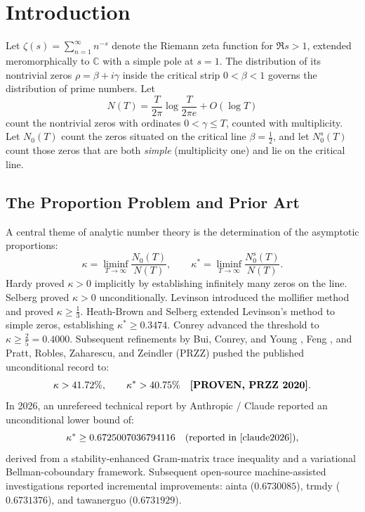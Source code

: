 \documentclass[11pt,a4paper]{article}
\theoremstyle{remark}
\newcommand{\Nc}{N_0^s}
\begin{document}
\tableofcontents

\section{Introduction}

Let $\zeta(s) = \sum_{n=1}^\infty n^{-s}$ denote the Riemann zeta function for $\Re s > 1$, extended meromorphically to $\mathbb{C}$ with a simple pole at $s=1$. The distribution of its nontrivial zeros $\rho = \beta + i\gamma$ inside the critical strip $0 < \beta < 1$ governs the distribution of prime numbers. Let
\[
 N(T) = \frac{T}{2\pi}\log\frac{T}{2\pi e} + O(\log T)
\]
count the nontrivial zeros with ordinates $0 < \gamma \le T$, counted with multiplicity. Let $N_0(T)$ count the zeros situated on the critical line $\beta = \frac{1}{2}$, and let $\Nc(T)$ count those zeros that are both \emph{simple} (multiplicity one) and lie on the critical line.

\subsection{The Proportion Problem and Prior Art}
A central theme of analytic number theory is the determination of the asymptotic proportions:
\[
 \kappa = \liminf_{T\to\infty} \frac{N_0(T)}{N(T)}, \qquad \kappa^* = \liminf_{T\to\infty} \frac{\Nc(T)}{N(T)}.
\]
Hardy \cite{hardy1914} proved $\kappa > 0$ implicitly by establishing infinitely many zeros on the line. Selberg \cite{selberg1942} proved $\kappa > 0$ unconditionally. Levinson \cite{levinson1974} introduced the mollifier method and proved $\kappa \ge \frac{1}{3}$. Heath-Brown and Selberg \cite{PLACEHOLDER_heathbrown1979} extended Levinson's method to simple zeros, establishing $\kappa^* \ge 0.3474$. Conrey \cite{conrey1989} advanced the threshold to $\kappa \ge \frac{2}{5} = 0.4000$. Subsequent refinements by Bui, Conrey, and Young \cite{bui2011}, Feng \cite{PLACEHOLDER_feng2012}, and Pratt, Robles, Zaharescu, and Zeindler (PRZZ) \cite{przz2020} pushed the published unconditional record to:
\[
 \kappa > 41.72\%, \qquad \kappa^* > 40.75\% \quad \text{\textbf{[PROVEN, PRZZ 2020]}}.
\]
In 2026, an unrefereed technical report by Anthropic / Claude \cite{claude2026} reported an unconditional lower bound of:
\[
 \kappa^* \ge 0.6725007036794116 \quad \text{(reported in \cite{claude2026})},
\]
derived from a stability-enhanced Gram-matrix trace inequality and a variational Bellman-coboundary framework. Subsequent open-source machine-assisted investigations reported incremental improvements: ainta \cite{ainta} ($0.6730085$), trmdy \cite{trmdy} ($0.6731376$), and tawanerguo \cite{tawanerguo} ($0.6731929$).
\end{document}
